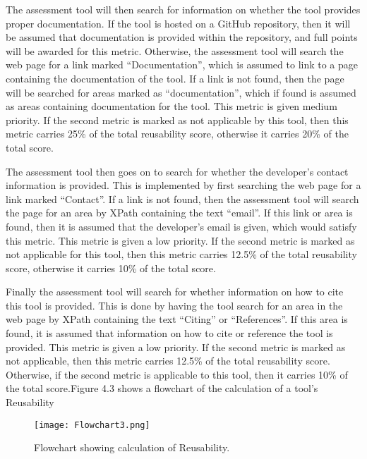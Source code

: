 \documentclass{cisfyp}
\begin{document}
The assessment tool will then search for information on whether the tool provides proper documentation. If the tool is hosted on a GitHub repository, then it will be assumed that documentation is provided within the repository, and full points will be awarded for this metric. Otherwise, the assessment tool will search the web page for a link marked ``Documentation'', which is assumed to link to a page containing the documentation of the tool. If a link is not found, then the page will be searched for areas marked as ``documentation'', which if found is assumed as areas containing documentation for the tool. This metric is given medium priority. If the second metric is marked as not applicable by this tool, then this metric carries 25\% of the total reusability score, otherwise it carries 20\% of the total score.

The assessment tool then goes on to search for whether the developer's contact information is provided. This is implemented by first searching the web page for a link marked ``Contact''. If a link is not found, then the assessment tool will search the page for an area by XPath containing the text ``email''. If this link or area is found, then it is assumed that the developer's email is given, which would satisfy this metric. This metric is given a low priority. If the second metric is marked as not applicable for this tool, then this metric carries 12.5\% of the total reusability score, otherwise it carries 10\% of the total score.

Finally the assessment tool will search for whether information on how to cite this tool is provided. This is done by having the tool search for an area in the web page by XPath containing the text ``Citing'' or ``References''. If this area is found, it is assumed that information on how to cite or reference the tool is provided. This metric is given a low priority. If the second metric is marked as not applicable, then this metric carries 12.5\% of the total reusability score. Otherwise, if the second metric is applicable to this tool, then it carries 10\% of the total score.\newline\newline Figure 4.3 shows a flowchart of the calculation of a tool's Reusability
\begin{figure}[h]
	\texttt{[image: Flowchart3.png]}
	\caption{Flowchart showing calculation of Reusability.}
	\label{fig:flowchart3}
\end{figure}
\pagebreak
\end{document}
